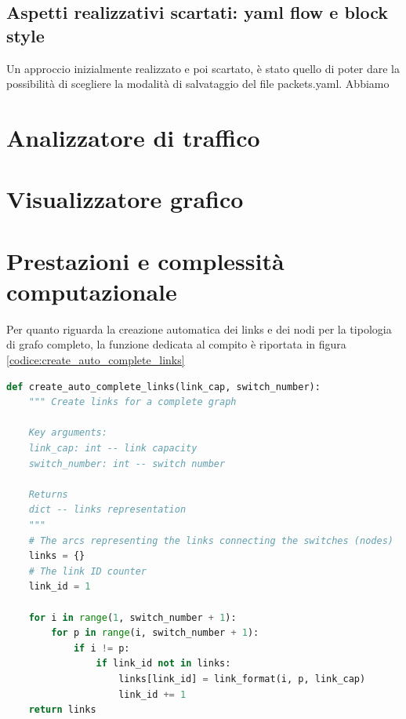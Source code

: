 \documentclass[binding=0.6cm]{sapthesis}
\begin{document}
 \section{Aspetti realizzativi scartati: yaml flow e block style}
 Un approccio inizialmente realizzato e poi scartato, è stato quello di poter dare la possibilità di scegliere la modalità di salvataggio del file packets.yaml.
 Abbiamo

\chapter{Analizzatore di traffico}

\chapter{Visualizzatore grafico}
\chapter{Prestazioni e complessità computazionale}



Per quanto riguarda la creazione automatica dei links e dei nodi
per la tipologia di grafo completo, la funzione dedicata al compito è riportata in figura \ref{codice:create_auto_complete_links}

{\scriptsize %
\begin{lstlisting}[language=Python, basicstyle=\ttfamily, caption={funzione per la creazione automatica di un grafo di rete completo}, label={codice:create_auto_complete_links}]
    def create_auto_complete_links(link_cap, switch_number):
    """ Create links for a complete graph 
    
    Key arguments:
    link_cap: int -- link capacity
    switch_number: int -- switch number

    Returns
    dict -- links representation
    """
    # The arcs representing the links connecting the switches (nodes)
    links = {}
    # The link ID counter
    link_id = 1

    for i in range(1, switch_number + 1):
        for p in range(i, switch_number + 1):
            if i != p:
                if link_id not in links:
                    links[link_id] = link_format(i, p, link_cap)
                    link_id += 1
    return links
\end{lstlisting}
} %
\end{document}
